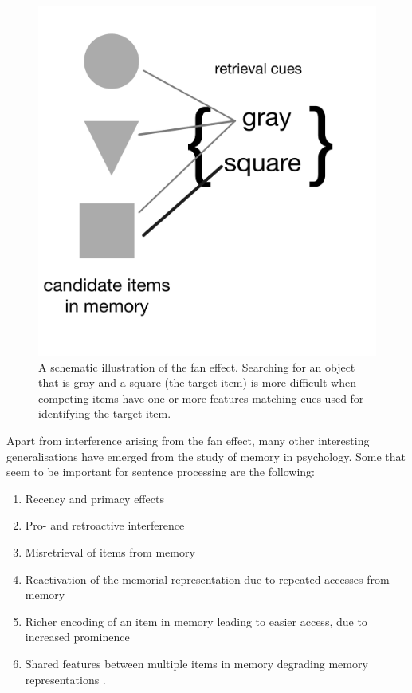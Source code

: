 \documentclass{cambridge7A}\usepackage[]{graphicx}\usepackage[]{color}
\begin{document}
\begin{figure}[!htbp]
\centering
\includegraphics[width=\textwidth]{figures/spreadingactivation}
\caption{A schematic illustration of the fan effect. Searching for an object that is gray and a square (the target item) is more difficult when competing items have one or more features matching cues used for identifying the target item.}\label{fig:faneffect}
\end{figure}
 
Apart from interference arising from the fan effect, many other interesting generalisations have emerged from the study of memory in psychology. Some that seem to be important for sentence processing are the following: 
 
 \begin{enumerate}
\item Recency and primacy effects \citep{Nairne1988,gibsonetal96}
 
\item Pro- and retroactive interference \citep{WatkinsWatkins1975,keppelunderwood,lewis:magical}
\item  Misretrieval of items from memory \citep{patson2016misinterpretations}
\item Reactivation of the memorial representation  due to repeated accesses from memory \citep{VasishthLewis2006} 
 
\item Richer encoding of an item in memory leading to easier access, due to increased prominence \citep{hofmeister07,hofmeister2011representational,HofmeisterVasishth2014}
\item Shared features between multiple items in memory degrading memory representations \citep{Nairne1990,OberauerKliegl2006,VasishthEtAlICCM2017}. 
\end{enumerate}
\end{document}
